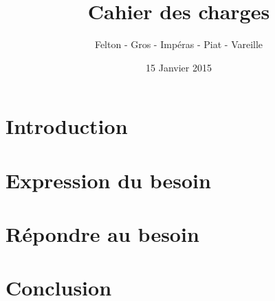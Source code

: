 \documentclass[a4paper]{article}
\title{\Huge \textbf{Cahier des charges}}
\author{\Large Felton - Gros - Impéras - Piat - Vareille}
\date{15 Janvier 2015}
\begin{document}
\maketitle
\newpage

\tableofcontents
\newpage

\section*{Introduction}
\section*{Expression du besoin}
\section*{Répondre au besoin}
\section*{Conclusion}
\end{document}
